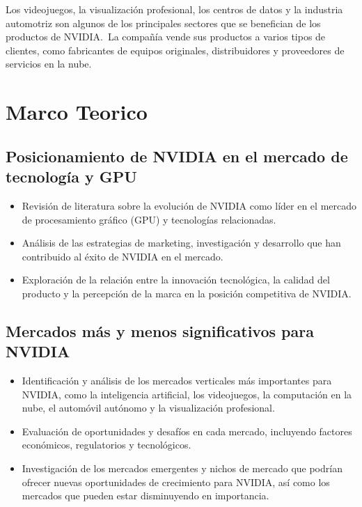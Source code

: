 \documentclass[twocolumn, 12pt]{article}
\begin{document}
Los videojuegos, la visualización profesional, los centros
de datos y la industria automotriz son algunos de los
principales sectores que se benefician de los productos de NVIDIA.~La
compañía vende sus productos a varios tipos de clientes,
como fabricantes de equipos originales, distribuidores y
proveedores de servicios en la nube.

\section{Marco Teorico}

\subsection*{Posicionamiento de NVIDIA en el mercado de tecnología y GPU}

\begin{itemize}
      \item Revisión de literatura sobre la evolución de NVIDIA
            como líder en el mercado de procesamiento gráfico (GPU) y
            tecnologías relacionadas.

      \item Análisis de las estrategias de marketing,
            investigación y desarrollo que han contribuido al éxito de
            NVIDIA en el mercado.

      \item Exploración de la relación entre la innovación
            tecnológica, la calidad del producto y la percepción de la
            marca en la posición competitiva de NVIDIA.\@{}
\end{itemize}

\subsection*{Mercados más y menos significativos para NVIDIA}

\begin{itemize}
      \item Identificación y análisis de los mercados verticales más
            importantes para NVIDIA, como la inteligencia artificial, los
            videojuegos, la computación en la nube, el automóvil autónomo
            y la visualización profesional.

      \item Evaluación de oportunidades y desafíos en cada mercado,
            incluyendo factores económicos, regulatorios y tecnológicos.

      \item Investigación de los mercados emergentes y nichos
            de mercado que podrían ofrecer nuevas oportunidades de
            crecimiento para NVIDIA, así como los mercados que pueden
            estar disminuyendo en importancia.
\end{itemize}
\end{document}
